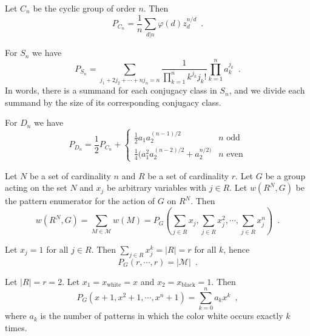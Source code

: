 \begin{example} Let $C_n$ be the cyclic group of order $n$. Then
$$
P_{C_n} = \frac{1}{n} \sum_{d | n} \varphi(d) z_d^{n / d} \enspace.
$$
\end{example}

\begin{example} For $S_n$ we have
$$
P_{S_n} = \sum_{j_1 + 2j_2 + \cdots + nj_n = n}
\frac{1}{\prod_{k = 1}^n k^{j_k} j_k!} \prod_{k = 1}^n a_k^{j_k}
\enspace.
$$
In words, there is a summand for each conjugacy class in $S_n$, and we divide each summand by the size of its corresponding conjugacy class.
\end{example}

\begin{example} For $D_n$ we have
$$
P_{D_n} = \frac{1}{2} P_{C_n} +
\begin{cases}
\frac{1}{2} a_1 a_2^{(n - 1) / 2} & n \text{ odd} \\
\frac{1}{4} (a_1^2 a_2^{(n - 2) / 2} + a_2^{n / 2)} & n \text{ even}
\end{cases}
$$
\end{example}

\begin{theorem}[Polya] \cite[88]{Aigner2007} Let $N$ be a set of cardinality $n$ and $R$ be a set of cardinality $r$. Let $G$ be a group acting on the set $N$ and $x_j$ be arbitrary variables with $j \in R$. Let $w(R^N, G)$ be the pattern enumerator for the action of $G$ on $R^N$. Then
$$
w(R^N, G) = \sum_{M \in \mathcal{M}} w(M) = P_G(\sum_{j \in R} x_j, \sum_{j \in R} x_j^2, \cdots, \sum_{j \in R} x_j^n) \enspace.
$$
\end{theorem}

\begin{corollary} \cite[89]{Aigner2007} Let $x_j = 1$ for all $j \in R$. Then $\sum_{j \in R} x_j^k = |R| = r$ for all $k$, hence
$$
P_G(r, \cdots, r) = |\mathcal{M}| \enspace.
$$
\end{corollary}

\begin{corollary} \cite[89]{Aigner2007} Let $|R| = r = 2$. Let $x_1 = x_{\text{white}} = x$ and $x_2 = x_{\text{black}} = 1$. Then
$$
P_G(x + 1, x^2 + 1, \cdots, x^n + 1) = \sum_{k = 0}^n a_k x^k \enspace,
$$
where $a_k$ is the number of patterns in which the color white occurs exactly $k$ times.
\end{corollary}

